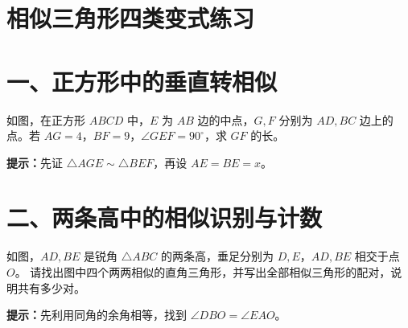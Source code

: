 \documentclass{exam-zh}
\begin{document}
\section*{相似三角形四类变式练习}

\section*{一、正方形中的垂直转相似}


\begin{problem}[points=10]
  \noindent
  \begin{minipage}[t]{\dimexpr\linewidth-60mm-6mm\relax}
    \vspace{0pt}
    如图，在正方形 $ABCD$ 中，$E$ 为 $AB$ 边的中点，$G,F$ 分别为 $AD,BC$ 边上的点。若 $AG=4$，$BF=9$，$\angle GEF=90^\circ$，求 $GF$ 的长。

    \begin{hintbox}
\textbf{提示：}先证 $\triangle AGE\sim\triangle BEF$，再设 $AE=BE=x$。\end{hintbox}

  \end{minipage}\hfill
  \begin{diagramcoltikz}{60mm}{先找两组直角，再观察 $GE\perp EF$ 带来的等角。}
  }
  \end{diagramcoltikz}
  \par\medskip
  \answerarea[54mm]
\end{problem}


\section*{二、两条高中的相似识别与计数}


\begin{problem}[points=10]
  \noindent
  \begin{minipage}[t]{\dimexpr\linewidth-60mm-6mm\relax}
    \vspace{0pt}
    如图，$AD,BE$ 是锐角 $\triangle ABC$ 的两条高，垂足分别为 $D,E$，$AD,BE$ 相交于点 $O$。
请找出图中四个两两相似的直角三角形，并写出全部相似三角形的配对，说明共有多少对。

    \begin{hintbox}
\textbf{提示：}先利用同角的余角相等，找到 $\angle DBO=\angle EAO$。\end{hintbox}

  \end{minipage}\hfill
  \begin{diagramcoltikz}{60mm}{弧角未预先标出，请从两条高自己找等角。}
  }
  \end{diagramcoltikz}
  \par\medskip
  \answerarea[68mm]
\end{problem}
\end{document}
